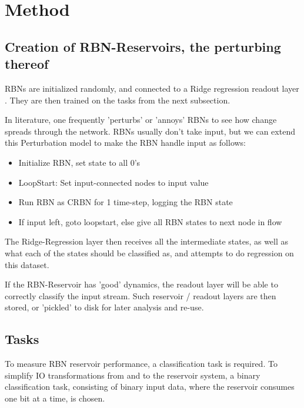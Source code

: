 \section{Method}


\subsection{Creation of RBN-Reservoirs, the perturbing thereof}

RBNs are initialized randomly, and connected to a Ridge regression readout layer \cite{WhatIsRidgeRegression?}.
They are then trained on the tasks from the next subsection.

In literature, one frequently 'perturbs' or 'annoys' RBNs to see how change spreads through the network. \cite{CitationMissing}
RBNs usually don't take input, but we can extend this Perturbation model to make the RBN handle input as follows:

\begin{itemize}
  \item Initialize RBN, set state to all 0's
  \item LoopStart: Set input-connected nodes to input value
  \item Run RBN as CRBN for 1 time-step, logging the RBN state
  \item If input left, goto loopstart, else give all RBN states to next node in flow
\end{itemize}

The Ridge-Regression layer then receives all the intermediate states, as well as what each of the states should be classified as, and attempts to do regression on this dataset.

If the RBN-Reservoir has 'good' dynamics,
the readout layer will be able to correctly classify the input stream.
Such reservoir / readout layers are then stored, or 'pickled' to disk for later analysis and re-use.

\subsection{Tasks}

To measure RBN reservoir performance, a classification task is required.
To simplify IO transformations from and to the reservoir system,
a binary classification task, consisting of binary input data,
where the reservoir consumes one bit at a time, is chosen.


